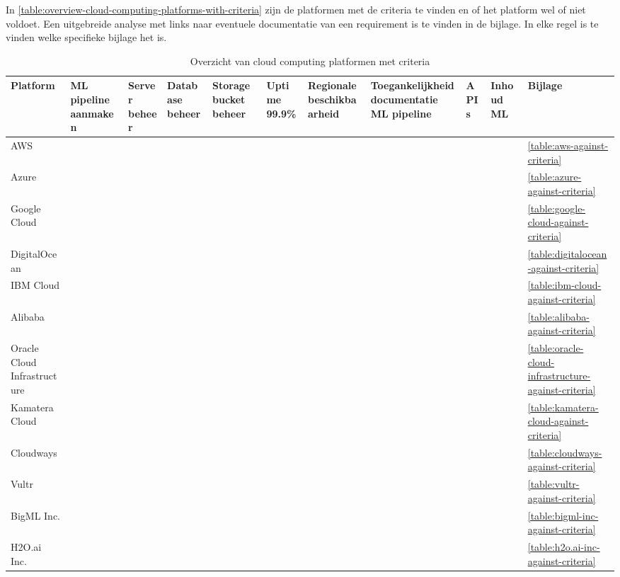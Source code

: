 In \autoref{table:overview-cloud-computing-platforms-with-criteria} zijn de platformen met de criteria te vinden en of het platform wel of niet voldoet. Een uitgebreide analyse met links naar eventuele documentatie van een requirement is te vinden in de bijlage. In elke regel is te vinden welke specifieke bijlage het is.

\newpage

\begin{table}[hbt!]
  \footnotesize
  \centering
  \begin{sideways}
  \begin{tabular}{|p{.14\linewidth}|p{.12\linewidth}|p{.065\linewidth}|p{.09\linewidth}|p{.075\linewidth}|p{.07\linewidth}|p{.1\linewidth}|p{.165\linewidth}|p{.05\linewidth}|p{.07\linewidth}|p{.07\linewidth}|}
  \hline
  \textbf{Platform} & \textbf{ML pipeline aanmaken} & \textbf{Server beheer} & \textbf{Database beheer} & \textbf{Storage bucket beheer} & \textbf{Uptime 99.9\%} & \textbf{Regionale beschikbaarheid} & \textbf{Toegankelijkheid documentatie ML pipeline} & \textbf{APIs} & \textbf{Inhoud ML} & \textbf{Bijlage} \\ \hline
  AWS&&&&&&&&&&\autoref{table:aws-against-criteria}\\ \hline
  Azure&&&&&&&&&&\autoref{table:azure-against-criteria}\\ \hline
  Google Cloud&&&&&&&&&&\autoref{table:google-cloud-against-criteria}\\ \hline
  DigitalOcean&&&&&&&&&&\autoref{table:digitalocean-against-criteria}\\ \hline
  IBM Cloud&&&&&&&&&&\autoref{table:ibm-cloud-against-criteria}\\ \hline
  Alibaba&&&&&&&&&&\autoref{table:alibaba-against-criteria}\\ \hline
  Oracle Cloud Infrastructure&&&&&&&&&&\autoref{table:oracle-cloud-infrastructure-against-criteria}\\ \hline
  Kamatera Cloud&&&&&&&&&&\autoref{table:kamatera-cloud-against-criteria}\\ \hline
  Cloudways&&&&&&&&&&\autoref{table:cloudways-against-criteria}\\ \hline
  Vultr&&&&&&&&&&\autoref{table:vultr-against-criteria}\\ \hline
  BigML Inc.&&&&&&&&&&\autoref{table:bigml-inc-against-criteria}\\ \hline
  H2O.ai Inc.&&&&&&&&&&\autoref{table:h2o.ai-inc-against-criteria}\\ \hline
  \end{tabular}
  \end{sideways}
  \caption{Overzicht van cloud computing platformen met criteria}
  \label{table:overview-cloud-computing-platforms-with-criteria}
\end{table}

